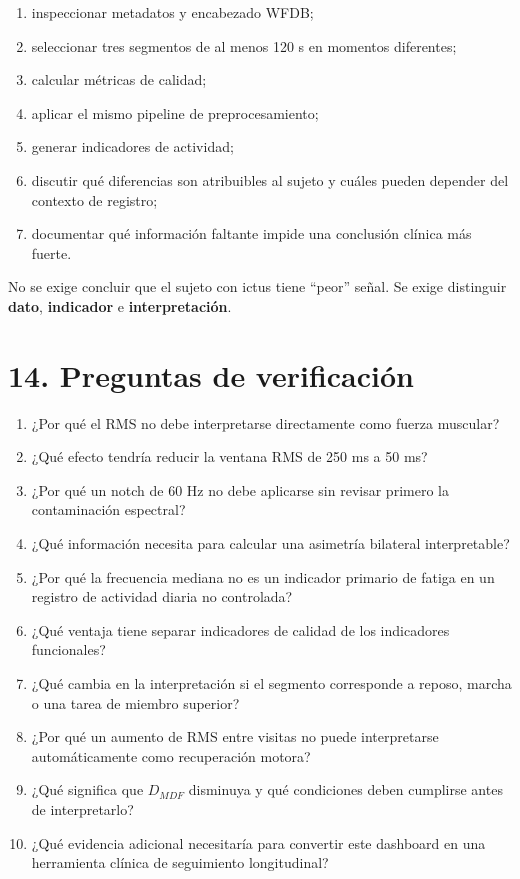 \documentclass[
  spanish,
  a4paper,
  DIV=11,
  numbers=noendperiod]{scrreprt}
\providecommand{\tightlist}{%
  \setlength{\itemsep}{0pt}\setlength{\parskip}{0pt}}
\begin{document}
\begin{enumerate}
\def\labelenumi{\arabic{enumi}.}
\tightlist
\item
  inspeccionar metadatos y encabezado WFDB;
\item
  seleccionar tres segmentos de al menos 120 s en momentos diferentes;
\item
  calcular métricas de calidad;
\item
  aplicar el mismo pipeline de preprocesamiento;
\item
  generar indicadores de actividad;
\item
  discutir qué diferencias son atribuibles al sujeto y cuáles pueden
  depender del contexto de registro;
\item
  documentar qué información faltante impide una conclusión clínica más
  fuerte.
\end{enumerate}

No se exige concluir que el sujeto con ictus tiene ``peor'' señal. Se
exige distinguir \textbf{dato}, \textbf{indicador} e
\textbf{interpretación}.

\chapter{14. Preguntas de
verificación}\label{preguntas-de-verificaciuxf3n}

\begin{enumerate}
\def\labelenumi{\arabic{enumi}.}
\tightlist
\item
  ¿Por qué el RMS no debe interpretarse directamente como fuerza
  muscular?
\item
  ¿Qué efecto tendría reducir la ventana RMS de 250 ms a 50 ms?
\item
  ¿Por qué un notch de 60 Hz no debe aplicarse sin revisar primero la
  contaminación espectral?
\item
  ¿Qué información necesita para calcular una asimetría bilateral
  interpretable?
\item
  ¿Por qué la frecuencia mediana no es un indicador primario de fatiga
  en un registro de actividad diaria no controlada?
\item
  ¿Qué ventaja tiene separar indicadores de calidad de los indicadores
  funcionales?
\item
  ¿Qué cambia en la interpretación si el segmento corresponde a reposo,
  marcha o una tarea de miembro superior?
\item
  ¿Por qué un aumento de RMS entre visitas no puede interpretarse
  automáticamente como recuperación motora?
\item
  ¿Qué significa que \(D_{MDF}\) disminuya y qué condiciones deben
  cumplirse antes de interpretarlo?
\item
  ¿Qué evidencia adicional necesitaría para convertir este dashboard en
  una herramienta clínica de seguimiento longitudinal?
\end{enumerate}
\end{document}
